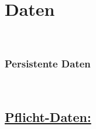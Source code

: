 %
%



\chapter{Daten}
\label{DT}~\\


\subsection{Persistente Daten}~\\

\section*{\underline{Pflicht-Daten:}}~\\

